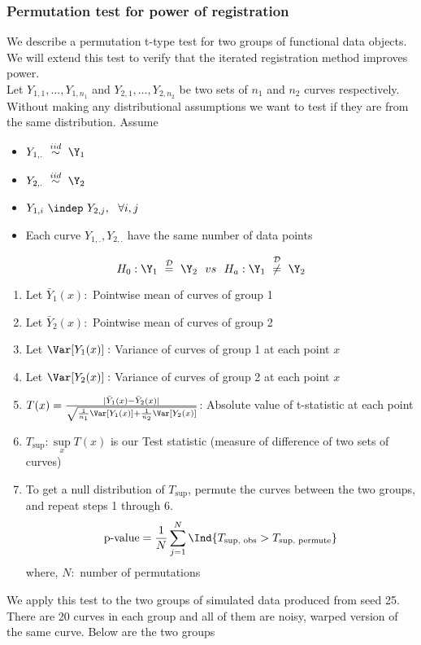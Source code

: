 \subsubsection{Permutation test for power of registration}
We describe a permutation t-type test for two groups of functional data objects. We will extend this test to verify that the iterated registration method improves power. \\
Let $Y_{1,1}, \dots, Y_{1,n_1}$ and $Y_{2,1}, \dots, Y_{2,n_2}$ be two sets of $n_1$ and $n_2$ curves respectively. Without making any distributional assumptions we want to test if they are from the same distribution.
Assume 
\begin{itemize}
\item $Y_{1,.}\  \stackrel{iid}{\sim} \ \Y_1$
\item $Y_{2,.}\  \stackrel{iid}{\sim} \ \Y_2$
\item $Y_{1,i}\  \indep \ Y_{2,j}, \ \ \forall i, j$
\item Each curve $Y_{1,.}, Y_{2,.}$ have the same number of data points
\end{itemize}
\[ H_0: \Y_1 \ \stackrel{\mathcal{D}}{=} \ \Y_2 \ \ vs \ \ H_a: \Y_1 \ \stackrel{\mathcal{D}}{\ne} \ \Y_2 \]
\begin{enumerate}
\item Let $\bar{Y}_1(x): $ Pointwise mean of curves of group 1
\item Let $\bar{Y}_2(x): $ Pointwise mean of curves of group 2
\item Let $\Var[Y_1(x)]: $ Variance of curves of group 1 at each point $x$ 
\item Let $\Var[Y_2(x)]: $ Variance of curves of group 2 at each point $x$ 
\item $T(x) = \frac{|\bar{Y}_1(x) - \bar{Y}_2(x)|}{\sqrt{\frac{1}{n_1}\Var[Y_1(x)] + 
\frac{1}{n_2}\Var[Y_2(x)]}}$: Absolute value of t-statistic at each point
\item $T_{\text{sup}}:  \sup\limits_{x} T(x)$ is our Test statistic (measure of difference of two sets of curves)
\item To get a null distribution of $T_{\text{sup}}$, permute the curves between the two groups, and repeat steps 1 through 6. \\
\[  \text{p-value} = \frac{1}{N}\sum\limits_{j = 1}^{N}\Ind\{T_{\text{sup, obs}} > T_{\text{sup, permute}} \} \]
where, $N:$ number of permutations
\end{enumerate}
We apply this test to the two groups of simulated data produced from seed 25. There are 20 curves in each group and all of them are noisy, warped version of the same curve. Below are the two groups
